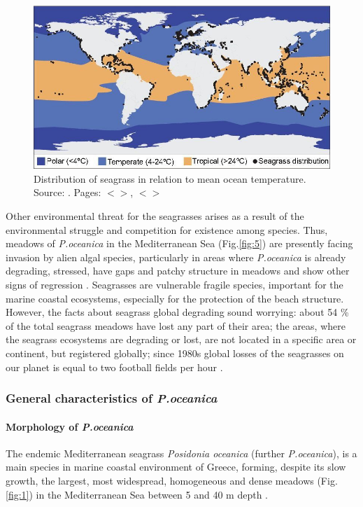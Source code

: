 \documentclass[11pt]{article}
\begin{document}
\begin{figure}
	\centering
	\includegraphics[scale=0.25]{Fig-1-4.jpg}
	\caption{Distribution of seagrass in relation to mean ocean temperature. 	Source: \cite{Orth06}\label{Orth06}. Pages: $<$\pageref{page-2}$>$, $<$\pageref{page-4}$>$}
	\label{Fig.4}
\end{figure}

Other environmental threat for the seagrasses arises as a result of the environmental struggle and
competition for existence among species. Thus, meadows of \textit{P.oceanica} in the Mediterranean Sea (Fig.\ref{fig:5})\label{page-4} are
presently facing invasion by alien algal species, particularly in areas where \textit{P.oceanica} is already
degrading, stressed, have gaps and patchy structure in meadows and show other signs of regression
\cite{Montefalcone10}\label{Montefalcone10}.
Seagrasses are vulnerable fragile species, important for the marine coastal ecosystems, especially for
the protection of the beach structure. However, the facts about seagrass global degrading sound
worrying: about 54 \% of the total seagrass meadows have lost any part of their area; the areas, where
the seagrass ecosystems are degrading or lost, are not located in a specific area or continent, but
registered globally; since 1980s global losses of the seagrasses on our planet is equal to two football
fields per hour \cite{Mellors09b}\label{Mellors09b}.
\pagebreak

\subsubsection{General characteristics of \textit{P.oceanica}}
\paragraph{Morphology of \textit{P.oceanica}}
The endemic Mediterranean seagrass \textit{Posidonia oceanica} (further \textit{P.oceanica}), is a main species in
marine coastal environment of Greece, forming, despite its slow growth, the largest, most widespread,
homogeneous and dense meadows (Fig.\ref{fig:1}) in the Mediterranean Sea between 5 and 40 m depth \cite{DenHartog70}\label{DenHartog70}.
\end{document}
